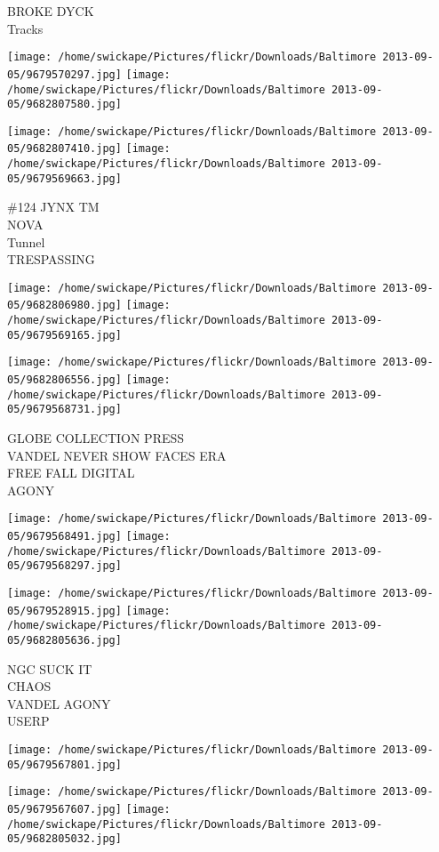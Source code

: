 \documentclass[10pt,letterpaper]{article}
\begin{document}
BROKE DYCK\\
Tracks
\pagebreak

\texttt{[image: /home/swickape/Pictures/flickr/Downloads/Baltimore 2013-09-05/9679570297.jpg]}
\texttt{[image: /home/swickape/Pictures/flickr/Downloads/Baltimore 2013-09-05/9682807580.jpg]}

\texttt{[image: /home/swickape/Pictures/flickr/Downloads/Baltimore 2013-09-05/9682807410.jpg]}
\texttt{[image: /home/swickape/Pictures/flickr/Downloads/Baltimore 2013-09-05/9679569663.jpg]}

\#124 JYNX TM\\
NOVA\\
Tunnel\\
TRESPASSING
\pagebreak

\texttt{[image: /home/swickape/Pictures/flickr/Downloads/Baltimore 2013-09-05/9682806980.jpg]}
\texttt{[image: /home/swickape/Pictures/flickr/Downloads/Baltimore 2013-09-05/9679569165.jpg]}

\texttt{[image: /home/swickape/Pictures/flickr/Downloads/Baltimore 2013-09-05/9682806556.jpg]}
\texttt{[image: /home/swickape/Pictures/flickr/Downloads/Baltimore 2013-09-05/9679568731.jpg]}

GLOBE COLLECTION PRESS\\
VANDEL NEVER SHOW FACES ERA\\
FREE FALL DIGITAL\\
AGONY
\pagebreak

\texttt{[image: /home/swickape/Pictures/flickr/Downloads/Baltimore 2013-09-05/9679568491.jpg]}
\texttt{[image: /home/swickape/Pictures/flickr/Downloads/Baltimore 2013-09-05/9679568297.jpg]}

\texttt{[image: /home/swickape/Pictures/flickr/Downloads/Baltimore 2013-09-05/9679528915.jpg]}
\texttt{[image: /home/swickape/Pictures/flickr/Downloads/Baltimore 2013-09-05/9682805636.jpg]}

NGC SUCK IT\\
CHAOS\\
VANDEL AGONY\\
USERP
\pagebreak

\texttt{[image: /home/swickape/Pictures/flickr/Downloads/Baltimore 2013-09-05/9679567801.jpg]}

\vspace{0.25in}
\texttt{[image: /home/swickape/Pictures/flickr/Downloads/Baltimore 2013-09-05/9679567607.jpg]}
\texttt{[image: /home/swickape/Pictures/flickr/Downloads/Baltimore 2013-09-05/9682805032.jpg]}
\end{document}

